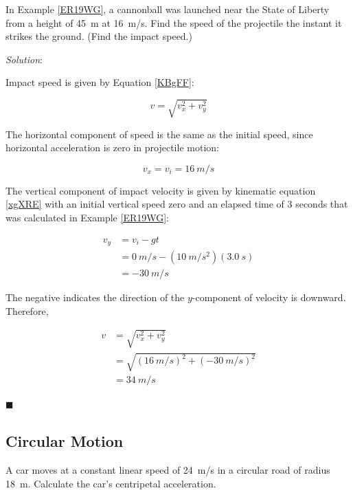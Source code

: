 \documentclass[dvipsnames]{article}
\begin{document}
\begin{example}
    In Example \ref{ER19WG}, a cannonball was launched near the State of Liberty from a height of \SI{45}{m} at \SI{16}{m/s}. Find the speed of the projectile the instant it strikes the ground. (Find the impact speed.)
\end{example}

\textit{Solution}:

Impact speed is given by Equation \eqref{KBgFF}:

\begin{equation*}
    v = \sqrt{v_x^2 + v_y^2}
\end{equation*}

The horizontal component of speed is the same as the initial speed, since horizontal acceleration is zero in projectile motion:

\begin{equation*}
    v_x = v_i = \SI{16}{m/s}
\end{equation*}

The vertical component of impact velocity is given by kinematic equation \eqref{xgXRE} with an initial vertical speed zero and an elapsed time of 3 seconds that was calculated in Example \ref{ER19WG}:

\begin{align*}
    v_y &= v_i - gt \\[1ex]
    &= \SI{0}{m/s} - (\SI{10}{m/s^2})(\SI{3.0}{s}) \\[1ex]
    &= -\SI{30}{m/s}
\end{align*}

The negative indicates the direction of the $y$-component of velocity is downward. Therefore,

\begin{align*}
    v &= \sqrt{v_x^2 + v_y^2} \\[1ex]
    &= \sqrt{(\SI{16}{m/s})^2 + (-\SI{30}{m/s})^2} \\[1ex]
    &= \boxed{\SI{34}{m/s}}
\end{align*}

\hfill $\blacksquare$

\clearpage

\subsection{Circular Motion}


\begin{example}
A car moves at a constant linear speed of \SI{24}{m/s} in a circular road of radius \SI{18}{m}. Calculate the car's centripetal acceleration.
\end{example}
\end{document}
